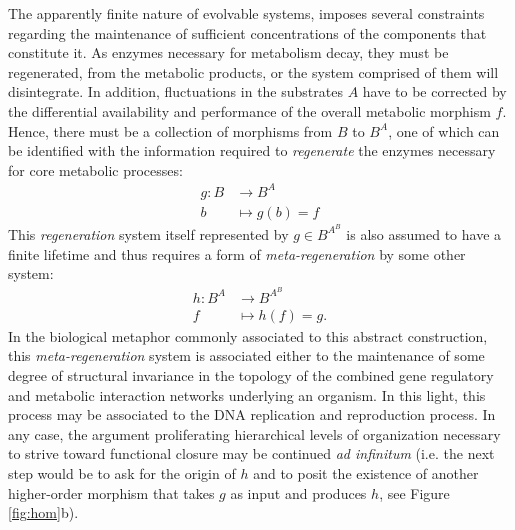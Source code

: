 The apparently finite nature of evolvable systems, imposes several constraints regarding the maintenance of sufficient concentrations of the components that constitute it. As enzymes necessary for metabolism decay, they must be regenerated, from the metabolic products, or the system comprised of them will disintegrate. In addition, fluctuations in the substrates $A$ have to be corrected by the differential availability and performance of the overall metabolic morphism $f$. Hence, there must be a collection of morphisms from $B$ to $B^A$, one of which can be identified with the information required to \emph{regenerate} the enzymes necessary for core metabolic processes:
\begin{align*}
g \colon B &\longrightarrow B^A\\
b &\longmapsto g(b)=f
\end{align*}
This \emph{regeneration} system itself represented by $g \in B^{A^B}$ is also assumed to have a finite lifetime and thus requires a form of \emph{meta-regeneration} by some other system:
\begin{align*}
h \colon B^A & \longrightarrow B^{A^B}\\
f & \longmapsto h(f)=g.
\end{align*}	
In the biological metaphor commonly associated to this abstract construction, this \emph{meta-regeneration} system is associated either to the maintenance of some degree of structural invariance in the topology of the combined gene regulatory and metabolic interaction networks underlying an organism. In this light, this process may be associated to the DNA replication and reproduction process. In any case, the argument proliferating hierarchical levels of organization necessary to strive toward functional closure may be continued \emph{ad infinitum} (i.e. the next step would be to ask for the origin of $h$ and to posit the existence of another higher-order morphism that takes $g$ as input and produces $h$, see Figure \ref{fig:hom}b). 

